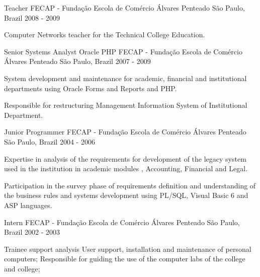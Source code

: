\begin{cventries}
  \cventry
    {Teacher} %
    {FECAP - Fundação Escola de Comércio Álvares Penteado} %
    {São Paulo, Brazil} %
    {2008 - 2009} %
    {
      \begin{cvitems} %
        \item {Computer Networks teacher for the Technical College Education.}
      \end{cvitems}
    }

  \cventry
    {Senior Systems Analyst Oracle PHP} %
    {FECAP - Fundação Escola de Comércio Álvares Penteado} %
    {São Paulo, Brazil} %
    {2007 - 2009} %
    {
      \begin{cvitems} %
        \item {System development and maintenance for academic, financial and institutional departments using Oracle Forms and Reports and PHP.}
       \item{Responsible for restructuring Management Information System of Institutional Department.}
      \end{cvitems}
    }

  \cventry
    {Junior Programmer} %
    {FECAP - Fundação Escola de Comércio Álvares Penteado} %
    {São Paulo, Brazil} %
    {2004 - 2006} %
    {
      \begin{cvitems} %
        \item {Expertise in analysis of the requirements for development of the legacy system used in the institution in academic modules , Accounting, Financial and Legal.}
        \item {Participation in the survey phase of requirements definition and understanding of the business rules and systems development using PL/SQL, Visual Basic 6 and ASP languages.}
      \end{cvitems}
    }

  \cventry
    {Intern} %
    {FECAP - Fundação Escola de Comércio Álvares Penteado} %
    {São Paulo, Brazil} %
    {2002 - 2003} %
    {
      \begin{cvitems} %
        \item {Trainee support analysis
User support, installation and maintenance of personal computers;
Responsible for guiding the use of the computer labs of the college and college;}
      \end{cvitems}
    }

\end{cventries}
